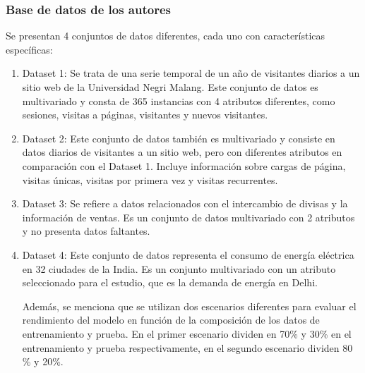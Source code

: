 \subsubsection{Base de datos de los autores}
Se presentan 4 conjuntos de datos diferentes, cada uno con características específicas:
\begin{enumerate}
	\item Dataset 1: Se trata de una serie temporal de un año de visitantes diarios a un sitio web de la Universidad Negri Malang. Este conjunto de datos es multivariado y consta de 365 instancias con 4 atributos diferentes, como sesiones, visitas a páginas, visitantes y nuevos visitantes. 
	\item Dataset 2: Este conjunto de datos también es multivariado y consiste en datos diarios de visitantes a un sitio web, pero con diferentes atributos en comparación con el Dataset 1. Incluye información sobre cargas de página, visitas únicas, visitas por primera vez y visitas recurrentes.
	\item Dataset 3: Se refiere a datos relacionados con el intercambio de divisas y la información de ventas. Es un conjunto de datos multivariado con 2 atributos y no presenta datos faltantes.
	\item Dataset 4: Este conjunto de datos representa el consumo de energía eléctrica en 32 ciudades de la India. Es un conjunto multivariado con un atributo seleccionado para el estudio, que es la demanda de energía en Delhi.
	
	Además, se menciona que se utilizan dos escenarios diferentes para evaluar el rendimiento del modelo en función de la composición de los datos de entrenamiento y prueba. En el primer escenario dividen en 70\% y 30\% en el entrenamiento y prueba respectivamente, en el segundo escenario dividen 80 \% y 20\%.
\end{enumerate}


